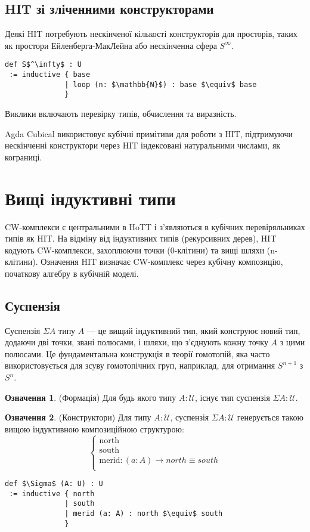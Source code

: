 \documentclass{article}
\theoremstyle{definition}
\newtheorem{definition}{Означення}
\begin{document}
\subsection{HIT зі зліченними конструкторами}
Деякі HIT потребують нескінченої кількості конструкторів для просторів,
таких як простори Ейленберга-МакЛейна або нескінченна сфера \( S^\infty \).
\begin{lstlisting}[mathescape=true]
def S$^\infty$ : U
 := inductive { base
              | loop (n: $\mathbb{N}$) : base $\equiv$ base
              }
\end{lstlisting}
Виклики включають перевірку типів, обчислення та виразність.

Agda Cubical використовує кубічні примітиви для роботи з HIT, підтримуючи
нескінченні конструктори через HIT індексовані натуральними числами, як кограниці.

\section{Вищі індуктивні типи}
CW-комплекси є центральними в HoTT і з’являються в кубічних перевіряльниках типів як HIT.
На відміну від індуктивних типів (рекурсивних дерев), HIT кодують CW-комплекси, захоплюючи
точки (0-клітини) та вищі шляхи (n-клітини). Означення HIT визначає CW-комплекс
через кубічну композицію, початкову алгебру в кубічній моделі.

\newpage
\subsection{Суспензія}
Суспензія \(\Sigma A\) типу \( A \) — це вищий індуктивний тип, який
конструює новий тип, додаючи дві точки, звані полюсами, і шляхи, що з’єднують
кожну точку \( A \) з цими полюсами. Це фундаментальна конструкція в теорії гомотопій,
яка часто використовується для зсуву гомотопічних груп, наприклад, для отримання \( S^{n+1} \) з \( S^n \).

\begin{definition} (Формація)
Для будь якого типу \( A : \mathcal{U} \), існує тип суспензія \( \Sigma A : \mathcal{U} \).
\end{definition}

\begin{definition} (Конструктори)
Для типу \( A : \mathcal{U} \), суспензія \( \Sigma A : \mathcal{U} \)
генерується такою вищою індуктивною композиційною структурою:
\[
\begin{cases}
\text{north} \\
\text{south} \\
\text{merid} : (a : A) \rightarrow north \equiv south \\
\end{cases}
\]
\begin{lstlisting}[mathescape=true]
def $\Sigma$ (A: U) : U
 := inductive { north
              | south
              | merid (a: A) : north $\equiv$ south
              }
\end{lstlisting}
\end{definition}
\end{document}
